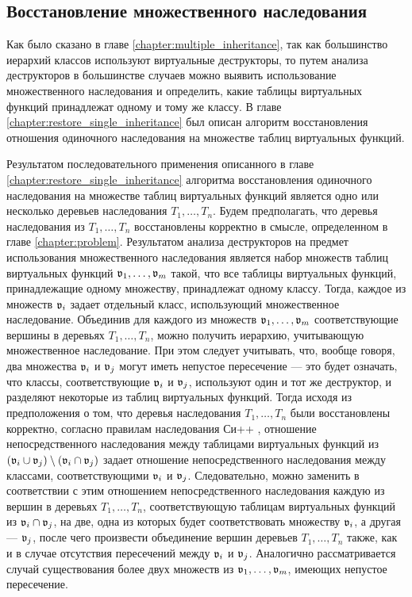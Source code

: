 \subsection{Восстановление множественного наследования}
Как было сказано в главе \ref{chapter:multiple_inheritance}, так как большинство иерархий классов используют виртуальные деструкторы, то путем анализа деструкторов в большинстве случаев можно выявить использование множественного наследования и определить, какие таблицы виртуальных функций принадлежат одному и тому же классу. В главе \ref{chapter:restore_single_inheritance} был описан алгоритм восстановления отношения одиночного наследования на множестве таблиц виртуальных функций.

Результатом последовательного применения описанного в главе \ref{chapter:restore_single_inheritance} алгоритма  восстановления одиночного наследования на множестве таблиц виртуальных функций является одно или несколько деревьев наследования $T_1, \ldots, T_n$. Будем предполагать, что деревья наследования из $T_1, \ldots, T_n$ восстановлены корректно в смысле, определенном в главе \ref{chapter:problem}. Результатом анализа деструкторов на предмет использования множественного наследования является набор множеств таблиц виртуальных функций $\mathfrak{v}_1, \ldots, \mathfrak{v}_m$ такой, что все таблицы виртуальных функций, принадлежащие одному множеству, принадлежат одному классу. Тогда, каждое из множеств $\mathfrak{v}_i$ задает отдельный класс, использующий множественное наследование. Объединив для каждого из множеств $\mathfrak{v}_1, \ldots, \mathfrak{v}_m$ соответствующие вершины в деревьях $T_1, \ldots, T_n$, можно получить иерархию, учитывающую множественное наследование. При этом следует учитывать, что, вообще говоря, два множества $\mathfrak{v}_i$ и $\mathfrak{v}_j$ могут иметь непустое пересечение --- это будет означать, что классы, соответствующие $\mathfrak{v}_i$ и $\mathfrak{v}_j$, используют один и тот же деструктор, и разделяют некоторые из таблиц виртуальных функций. Тогда исходя из предположения о том, что деревья наследования $T_1, \ldots, T_n$ были восстановлены корректно, согласно правилам наследования Си++ \cite{cpp03}, отношение непосредственного наследования между таблицами виртуальных функций из $(\mathfrak{v}_i \cup \mathfrak{v}_j) \setminus (\mathfrak{v}_i \cap \mathfrak{v}_j)$ задает отношение непосредственного наследования между классами, соответствующими $\mathfrak{v}_i$ и $\mathfrak{v}_j$. Следовательно, можно заменить в соответствии с этим отношением непосредственного наследования каждую из вершин в деревьях $T_1, \ldots, T_n$, соответствующую таблицам виртуальных функций из $\mathfrak{v}_i \cap \mathfrak{v}_j$, на две, одна из которых будет соответствовать множеству $\mathfrak{v}_i$, а другая --- $\mathfrak{v}_j$, после чего произвести объединение вершин деревьев $T_1, \ldots, T_n$ также, как и в случае отсутствия пересечений между $\mathfrak{v}_i$ и $\mathfrak{v}_j$. Аналогично рассматривается случай существования более двух множеств из $\mathfrak{v}_1, \ldots, \mathfrak{v}_m$, имеющих непустое пересечение.


